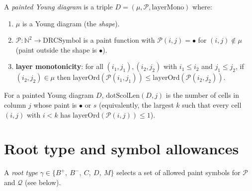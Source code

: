 \begin{definition}
  \label{def:pyd}
  \leanok
  A \emph{painted Young diagram} is a triple $D = (\mu, \mathcal{P}, \mathrm{layerMono})$ where:
  \begin{enumerate}
    \item $\mu$ is a Young diagram (the \emph{shape}).
    \item $\mathcal{P} : \mathbb{N}^2 \to \mathrm{DRCSymbol}$ is a paint function with
      $\mathcal{P}(i, j) = \bullet$ for $(i, j) \notin \mu$ (paint outside the shape is $\bullet$).
    \item \textbf{layer monotonicity}: for all $(i_1, j_1), (i_2, j_2)$ with $i_1 \leq i_2$ and $j_1 \leq j_2$,
      if $(i_2, j_2) \in \mu$ then $\mathrm{layerOrd}(\mathcal{P}(i_1, j_1)) \leq \mathrm{layerOrd}(\mathcal{P}(i_2, j_2))$.
  \end{enumerate}
\end{definition}

\begin{definition}
  \label{def:dotScolLen}
  \leanok
  For a painted Young diagram $D$, $\mathrm{dotScolLen}(D, j)$ is the number of cells in column $j$ whose paint is $\bullet$ or $s$ (equivalently, the largest $k$ such that every cell $(i, j)$ with $i < k$ has $\mathrm{layerOrd}(\mathcal{P}(i, j)) \leq 1$).
\end{definition}

\section{Root type and symbol allowances}

\begin{definition}
  \label{def:RootType}
  \leanok
  A \emph{root type} $\gamma \in \{B^+,\ B^-,\ C,\ D,\ M\}$ selects a set of allowed paint symbols for $\mathcal{P}$ and $\mathcal{Q}$ (see below).
\end{definition}


